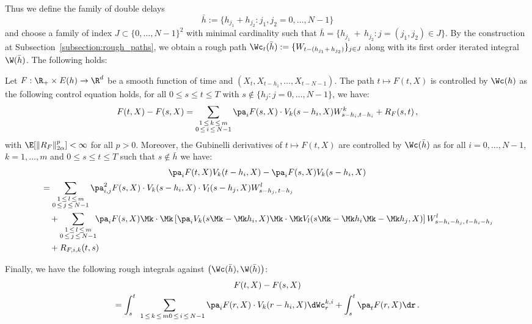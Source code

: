 Thus we define the family of double delays
\[
\bar h:=\{h_{j_1}+h_{j_2}:j_1,j_2=0,\dots, N-1\}
\]
and choose a family of index $J\subset \{0,\dots, N-1\}^2$ with minimal cardinality such that $\bar h=\{h_{j_1}\,+\,h_{j_2}:j=(j_1,j_2)\in J \}$. By the construction at Subsection~\ref{subsection:rough_paths}, we obtain a rough path $\Wc_t(\bar{h}):=\{W_{t-(h_{j_1}+\,h_{j_2})}\}_{j\in J}$ along with its first order iterated integral $\W(\bar{h})$. The following holds:

\goodbreak
\begin{prop}\label{proposition:equi}
Let $F: \R_+ \times E(h) \rightarrow \R^d$ be a smooth function of time and $\left(X_t, X_{t-h_1}, \dots, X_{t-{N-1}} \right)$. The path $t \mapsto F(t,X)$ is controlled by $\Wc(h)$ as the following control equation holds, for all $0\leq s\leq t\leq T$ with $s\notin \{h_j:j=0,\dots, N-1\}$, we have:
\begin{equation}\label{eq:control_V_j}
F(t,X)-F(s,X) =
\sum_{\substack{1\,\leq\,k\,\leq\,m \\
0\,\leq\,i\,\leq\,N-1}}
\pa_i F (s,X) \cdot V_k (s-h_i,X) W^{k}_{s-h_i,t-h_i} +R_{F}(s,t)\, ,
\end{equation}
with $\E[\|R_{F}\|_{2\alpha}^p]<\infty$ for all $p>0$. Moreover, the Gubinelli derivatives of $t \mapsto F(t,X)$ are controlled by $\Wc(\bar h)$ as for all $i=0,\dots, N-1$, $k=1,\dots,m $ and $0\leq s\leq t\leq T$ such that $s\notin \bar h$ we have:
\begin{multline}\label{eq:control_V_j_prime}
\pa_{i} F (t,X)V_{k} (t-h_{i},X)-\pa_{i} F (s,X)V_{k} (s-h_{i},X)\\
\begin{aligned}
&=\sum_{\substack{1\,\leq\,l\,\leq\,m \\
0\,\leq\,j\,\leq\,N-1} }
\pa_{i,j}^2 F(s,X) \cdot V_{k}(s-h_{i},X) \cdot V_l(s-h_j,X) W_{s-h_j,\,t-h_j}^{l}\\
&\quad+\sum_{\substack{1\,\leq\,l\,\leq\,m \\
0\,\leq\,j\,\leq\,N-1}}\!\! \pa_{i}F(s,X) \Mk\cdot\Mk \left[\pa_i V_{k}(s\Mk-\Mk h_{i},X) \Mk\cdot\Mk V_l(s\Mk-\Mk h_i\Mk-\Mk h_{j},X) \right] W_{s-h_{i}-h_j,\,t-h_{i}-h_j}^{l}\\
&\quad + R_{F,i,k}(t,s)
\end{aligned}
\end{multline}

Finally, we have the following rough integrals against $\left(\Wc(\bar{h}), \W(\bar{h}) \right)$:
\begin{multline}\label{eq:ito_vj_rough}
F(t,X)-F(s,X) \\
= 
\int_s^t
\!\!\sum_{\substack{\;\;\;1\,\leq\,k\,\leq\,m 
0\,\leq\,i\,\leq\,N-1}}
\pa_i F (r,X) \cdot V_k (r-h_i,X) \dWc^{k,i}_r+\int_s^t \pa_t F (r,X) \dr \, .
\end{multline}
\end{prop}
